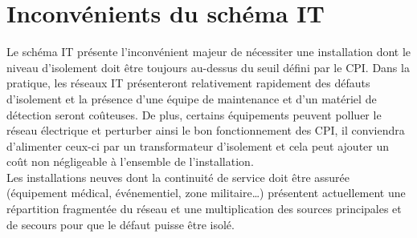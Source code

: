 \section{Inconvénients du schéma IT}

Le schéma IT présente l'inconvénient majeur de nécessiter une installation dont le niveau d'isolement doit être toujours au-dessus du seuil défini par le CPI. Dans la pratique, les réseaux IT présenteront relativement rapidement des défauts d'isolement et la présence d'une équipe de maintenance et d'un matériel de détection seront coûteuses. De plus, certains équipements peuvent polluer le réseau électrique et perturber ainsi le bon fonctionnement des CPI, il conviendra d'alimenter ceux-ci par un transformateur d'isolement et cela peut ajouter un coût non négligeable à l'ensemble de l'installation.\\
Les installations neuves dont la continuité de service doit être assurée (équipement médical, événementiel, zone militaire\ldots) présentent actuellement une répartition fragmentée du réseau et une multiplication des sources principales et de secours pour que le défaut puisse être isolé.

%


